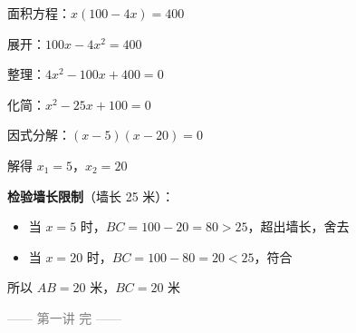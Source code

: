 \documentclass[12pt, a4paper]{article}
\begin{document}
\begin{answerbox}
\begin{enumerate}
        面积方程：$x(100 - 4x) = 400$
        
        展开：$100x - 4x^2 = 400$
        
        整理：$4x^2 - 100x + 400 = 0$
        
        化简：$x^2 - 25x + 100 = 0$
        
        因式分解：$(x - 5)(x - 20) = 0$
        
        解得 $x_1 = 5$，$x_2 = 20$
        
        \textbf{检验墙长限制}（墙长 25 米）：
        \begin{itemize}
            \item 当 $x = 5$ 时，$BC = 100 - 20 = 80 > 25$，超出墙长，舍去
            \item 当 $x = 20$ 时，$BC = 100 - 80 = 20 < 25$，符合
        \end{itemize}
        所以 $AB = 20$ 米，$BC = 20$ 米
    \end{enumerate}
\end{answerbox}

\vfill
\begin{center}
    \small \textcolor{gray}{—— 第一讲 完 ——}
\end{center}
\end{document}
